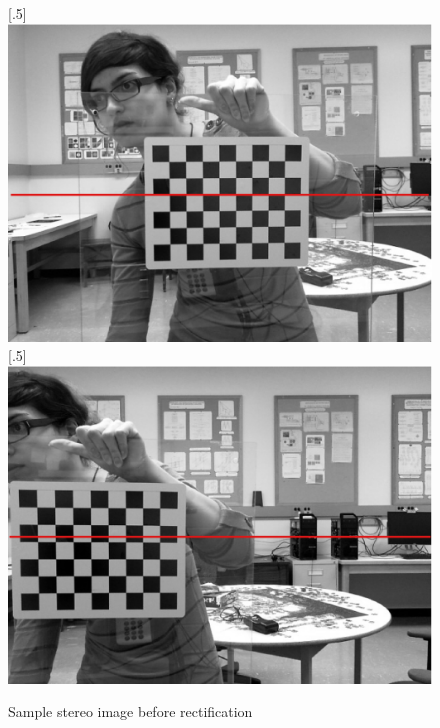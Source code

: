 \begin{figure}[H]
\centering
{}
[.5\linewidth]{\includegraphics[scale=0.35]{RectL}}%
[.5\linewidth]{\includegraphics[scale=0.35]{RectR}}%
\caption{Sample stereo image before rectification}
\label{fig:unrect}
\end{figure}

